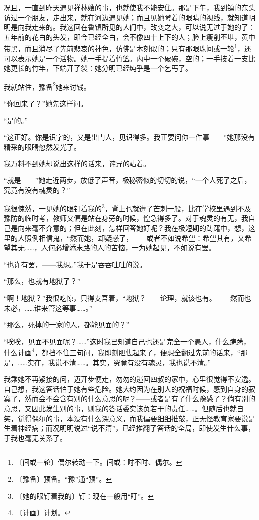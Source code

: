 \documentclass[12pt,UTF-8,openany]{ctexbook}
\begin{document}
\begin{normalsize}
    况且，一直到昨天遇见祥林嫂的事，也就使我不能安住。那是下午，我到镇的东头访过一个朋友，走出来，就在河边遇见她；而且见她瞪着的眼睛的视线，就知道明明是向我走来的。我这回在鲁镇所见的人们中，改变之大，可以说无过于她的了：五年前的花白的头发，即今已经全白，会不像四十上下的人；脸上瘦削丕堪，黄中带黑，而且消尽了先前悲哀的神色，仿佛是木刻似的；只有那眼珠间或一轮\footnote{〔间或一轮〕偶尔转动一下。间或：时不时、偶尔。}，还可以表示她是一个活物。她一手提着竹篮。内中一个破碗，空的；一手技着一支比她更长的竹竿，下端开了裂：她分明已经纯乎是一个乞丐了。
    
    我就站住，豫备\footnote{〔豫备〕预备。“豫”通“预”。}她来讨钱。
    
    “你回来了？”她先这样问。
    
    “是的。”
    
    “这正好。你是识字的，又是出门人，见识得多。我正要问你一件事——”她那没有精采的眼睛忽然发光了。
    
    我万料不到她却说出这样的话来，诧异的站着。
    
    “就是——”她走近两步，放低了声音，极秘密似的切切的说，“一个人死了之后，究竟有没有魂灵的？”
    
    我很悚然，一见她的眼钉着我的\footnote{〔她的眼钉着我的〕钉：现在一般用“盯”。}，背上也就遭了芒刺一般，比在学校里遇到不及豫防的临时考，教师又偏是站在身旁的时候，惶急得多了。对于魂灵的有无，我自己是向来毫不介意的；但在此刻，怎样回答她好呢？我在极短期的踌躇中，想，这里的人照例相信鬼，“然而她，却疑惑了，——或者不如说希望：希望其有，又希望其无……，人何必增添末路的人的苦恼，一为她起见，不如说有罢。
    
    “也许有罢，——我想。”我于是吞吞吐吐的说。
    
    “那么，也就有地狱了？”
    
    “啊！地狱？”我很吃惊，只得支吾着，“地狱？——论理，就该也有。——然而也未必，……谁来管这等事……。”
    
    “那么，死掉的一家的人，都能见面的？”
    
    “唉唉，见面不见面呢？……”这时我已知道自己也还是完全一个愚人，什么踌躇，什么计画\footnote{〔计画〕计划。}，都挡不住三句问，我即刻胆怯起来了，便想全翻过先前的话来，“那是，……实在，我说不清……。其实，究竟有没有魂灵，我也说不清。”
    
    我乘她不再紧接的问，迈开步便走，勿勿的逃回四叔的家中，心里很觉得不安逸。自己想，我这答话怕于她有些危险。她大约因为在别人的祝福时候，感到自身的寂寞了，然而会不会含有别的什么意思的呢？——或者是有了什么豫感了？倘有别的意思，又因此发生别的事，则我的答话委实该负若干的责任……。但随后也就自笑，觉得偶尔的事，本没有什么深意义，而我偏要细细推敲，正无怪教育家要说是生着神经病；而况明明说过“说不清”，已经推翻了答话的全局，即使发生什么事，于我也毫无关系了。
    

\end{normalsize}
\end{document}
